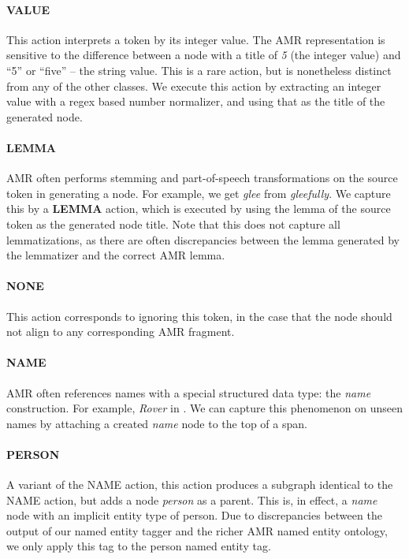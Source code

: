 \documentclass[11pt]{article}
\newcommand\w[1]{\textit{#1}} %
\newcommand\n[1]{\textit{#1}} %
\begin{document}
\paragraph{VALUE} This action interprets a token by its integer value. 
The AMR representation is sensitive to the difference between a node with a title
  of \n{5} (the integer value) and ``5'' or ``five'' -- the string value.
This is a rare action, but is nonetheless distinct from any of the other classes.
We execute this action by extracting an integer value with a regex based number normalizer, and using that as the title of the generated node.

\paragraph{LEMMA} AMR often performs stemming and part-of-speech transformations on the source token in generating a node. 
For example, we get \n{glee} from \w{gleefully}.
We capture this by a \textbf{LEMMA} action, which is executed by using the lemma of the source token as the generated node title.
Note that this does not capture all lemmatizations, as there are often discrepancies
  between the lemma generated by the lemmatizer and the correct AMR lemma.

\paragraph{NONE} This action corresponds to ignoring this token, in the case that
  the node should not align to any corresponding AMR fragment.

\paragraph{NAME} AMR often references names with a special structured data type: the \n{name} construction. 
For example, \w{Rover} in .
We can capture this phenomenon on unseen names by attaching a created \n{name} node to the top of a span.

\paragraph{PERSON} A variant of the NAME action, this action produces a subgraph identical to the NAME action, but adds a node \n{person} as a parent. This is, in effect, a \n{name} node with an implicit entity type of person. Due to discrepancies between the output of our named entity tagger and the richer AMR named entity ontology, we only apply this tag to the person named entity tag.
\end{document}

